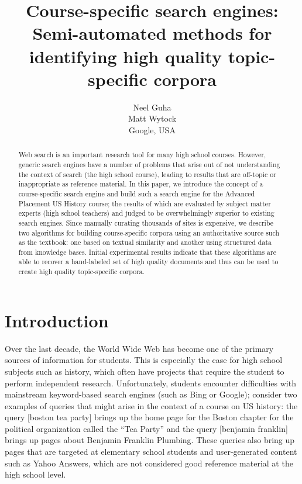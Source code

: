 \documentclass[pdfpagelabels=false,plainpages=true]{acm_proc_article-sp}
\begin{document}
\title{Course-specific search engines: Semi-automated methods for identifying
  high quality topic-specific corpora} 

\author{
  \alignauthor
  Neel Guha \\
  \alignauthor
  Matt Wytock \\
  Google, USA
}

\maketitle
\begin{abstract}
Web search is an important research tool for many high school courses. However,
generic search engines have a number of problems that arise out of
not understanding the context of search (the high school course),
leading to results that are off-topic or inappropriate as reference material. In
this paper, we introduce the concept of a course-specific search 
engine and build such a search engine for the Advanced Placement US
History course; the results of which are evaluated by subject matter experts (high
school teachers) and judged to be overwhelmingly superior to existing search
engines. Since manually curating thousands of sites is expensive, we describe two
algorithms for building course-specific corpora using an authoritative source
such as the textbook: one  
based on textual similarity and another using structured
data from knowledge bases. Initial experimental results indicate that
these algorithms are able to recover a hand-labeled set of high quality
documents and thus can be used to create high quality topic-specific corpora.
\end{abstract}

\section{Introduction}

Over the last decade, the World Wide Web has become one of the primary sources
of information for students. This is especially the case for high school
subjects such as history, which often have projects that require the student to 
perform independent research. Unfortunately, students encounter difficulties
with mainstream keyword-based search engines (such as Bing or Google); 
consider two examples of queries that might arise in the context of a course
on US history: the query [boston tea party] brings up the home page for the
Boston chapter for the political organization called the ``Tea Party'' and the
query [benjamin franklin] brings up pages about Benjamin Franklin
Plumbing. These queries also bring up pages that are targeted at elementary
school students and user-generated content such as Yahoo Answers, which are not
considered good reference material at the high school level.
\end{document}
